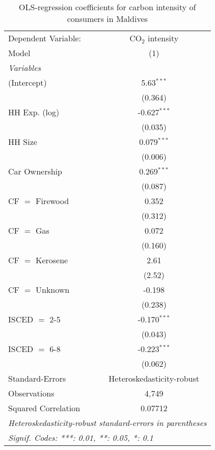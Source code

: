 
\begin{table}[htbp!]
   \centering
   \small
   \begin{adjustbox}{width = 1\textwidth, max height = 0.95\textheight, center}
      \begin{threeparttable}[b]
         \caption{\label{tab:OLS_1_MDV} OLS-regression coefficients for carbon intensity of consumers in Maldives}
         \begin{tabular}{lc}
            \tabularnewline \midrule \midrule
            Dependent Variable: & CO$_{2}$ intensity\\  
            Model               & (1)\\  
            \midrule
            \emph{Variables}\\
            (Intercept)         & 5.63$^{***}$\\   
                                & (0.364)\\   
            HH Exp. (log)       & -0.627$^{***}$\\   
                                & (0.035)\\   
            HH Size             & 0.079$^{***}$\\   
                                & (0.006)\\   
            Car Ownership       & 0.269$^{***}$\\   
                                & (0.087)\\   
            CF $=$ Firewood     & 0.352\\   
                                & (0.312)\\   
            CF $=$ Gas          & 0.072\\   
                                & (0.160)\\   
            CF $=$ Kerosene     & 2.61\\   
                                & (2.52)\\   
            CF $=$ Unknown      & -0.198\\   
                                & (0.238)\\   
            ISCED $=$ 2-5       & -0.170$^{***}$\\   
                                & (0.043)\\   
            ISCED $=$ 6-8       & -0.223$^{***}$\\   
                                & (0.062)\\   
            \midrule 
            Standard-Errors     & Heteroskedasticity-robust \\   
            Observations        & 4,749\\  
            Squared Correlation & 0.07712\\  
            \midrule \midrule
            \multicolumn{2}{l}{\emph{Heteroskedasticity-robust standard-errors in parentheses}}\\
            \multicolumn{2}{l}{\emph{Signif. Codes: ***: 0.01, **: 0.05, *: 0.1}}\\
         \end{tabular}
         

\end{threeparttable}
\end{adjustbox}
\end{table}
